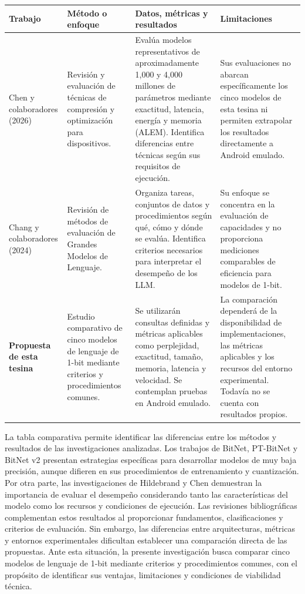 \begin{table}[H]
\centering
\fontsize{9}{10.5}\selectfont
\setlength{\tabcolsep}{3pt}
\renewcommand{\arraystretch}{1.04}
\begin{tabular}{@{}L{2.5cm}L{3.15cm}L{5.35cm}L{4.05cm}@{}}
\toprule
\textbf{Trabajo} & \textbf{Método o enfoque} & \textbf{Datos, métricas y resultados} & \textbf{Limitaciones} \\
\midrule
Chen y colaboradores (2026) \cite{onDeviceSurvey2026}
&
Revisión y evaluación de técnicas de compresión y optimización para dispositivos.
&
Evalúa modelos representativos de aproximadamente 1,000 y 4,000 millones de parámetros mediante exactitud, latencia, energía y memoria (ALEM). Identifica diferencias entre técnicas según sus requisitos de ejecución.
&
Sus evaluaciones no abarcan específicamente los cinco modelos de esta tesina ni permiten extrapolar los resultados directamente a Android emulado.
\\
\midrule
Chang y colaboradores (2024) \cite{llmEvaluation}
&
Revisión de métodos de evaluación de Grandes Modelos de Lenguaje.
&
Organiza tareas, conjuntos de datos y procedimientos según qué, cómo y dónde se evalúa. Identifica criterios necesarios para interpretar el desempeño de los LLM.
&
Su enfoque se concentra en la evaluación de capacidades y no proporciona mediciones comparables de eficiencia para modelos de 1-bit.
\\
\midrule
\textbf{Propuesta de esta tesina}
&
Estudio comparativo de cinco modelos de lenguaje de 1-bit mediante criterios y procedimientos comunes.
&
Se utilizarán consultas definidas y métricas aplicables como perplejidad, exactitud, tamaño, memoria, latencia y velocidad. Se contemplan pruebas en Android emulado.
&
La comparación dependerá de la disponibilidad de implementaciones, las métricas aplicables y los recursos del entorno experimental. Todavía no se cuenta con resultados propios.
\\
\bottomrule
\end{tabular}
\end{table}

La tabla comparativa permite identificar las diferencias entre los métodos y resultados de las investigaciones analizadas. Los trabajos de BitNet, PT-BitNet y BitNet v2 presentan estrategias específicas para desarrollar modelos de muy baja precisión, aunque difieren en sus procedimientos de entrenamiento y cuantización. Por otra parte, las investigaciones de Hildebrand y Chen demuestran la importancia de evaluar el desempeño considerando tanto las características del modelo como los recursos y condiciones de ejecución. Las revisiones bibliográficas complementan estos resultados al proporcionar fundamentos, clasificaciones y criterios de evaluación. Sin embargo, las diferencias entre arquitecturas, métricas y entornos experimentales dificultan establecer una comparación directa de las propuestas. Ante esta situación, la presente investigación busca comparar cinco modelos de lenguaje de 1-bit mediante criterios y procedimientos comunes, con el propósito de identificar sus ventajas, limitaciones y condiciones de viabilidad técnica.

